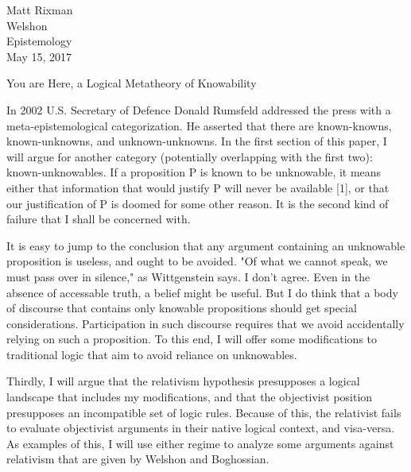 \documentclass[12pt]{article}
\begin{document}
\begin{flushleft}

Matt Rixman\\
Welshon\\
Epistemology\\
May 15, 2017\\


\begin{center}
    You are Here, a Logical Metatheory of Knowability
\end{center}


\setlength{\parindent}{0.5in}


In 2002 U.S. Secretary of Defence Donald Rumsfeld addressed the press with a meta-epistemological categorization.
He asserted that there are known-knowns, known-unknowns, and unknown-unknowns.
In the first section of this paper, I will argue for another category (potentially overlapping with the first two): known-unknowables.
If a proposition P is known to be unknowable, it means either that information that would justify P will never be available [1], or that our justification of P is doomed for some other reason.
It is the second kind of failure that I shall be concerned with.

It is easy to jump to the conclusion that any argument containing an unknowable proposition is useless, and ought to be avoided.
"Of what we cannot speak, we must pass over in silence," as Wittgenstein says.
I don't agree.
Even in the absence of accessable truth, a belief might be useful.
But I do think that a body of discourse that contains only knowable propositions should get special considerations.
Participation in such discourse requires that we avoid accidentally relying on such a proposition.
To this end, I will offer some modifications to traditional logic that aim to avoid reliance on unknowables.

Thirdly, I will argue that the relativism hypothesis presupposes a logical landscape that includes my modifications, and that the objectivist position presupposes an incompatible set of logic rules.
Because of this, the relativist fails to evaluate objectivist arguments in their native logical context, and visa-versa.
As examples of this, I will use either regime to analyze some arguments against relativism that are given by Welshon and Boghossian.


\end{flushleft}
\end{document}
